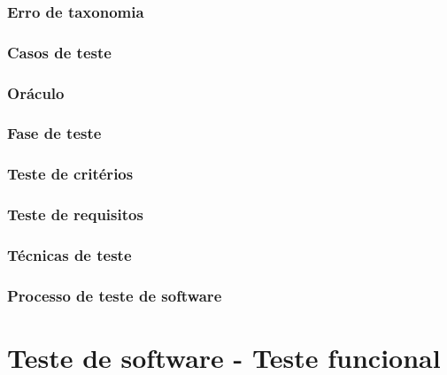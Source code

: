 \documentclass[utf8, usepdftitle=false, svgnames, color={table, fixpdftex, hyperref, fixinclude, xcdraw}, t, brazil]{beamer}
\begin{document}
		\section{Erro de taxonomia}
		

		\section{Casos de teste}
		

		\section{Oráculo}
		

		\section{Fase de teste}
		

		\section{Teste de critérios}
		

		\section{Teste de requisitos}
		

		\section{Técnicas de teste}
		 

		\section{Processo de teste de software}
		 


	\part{Teste de software - Teste funcional}
\end{document}
